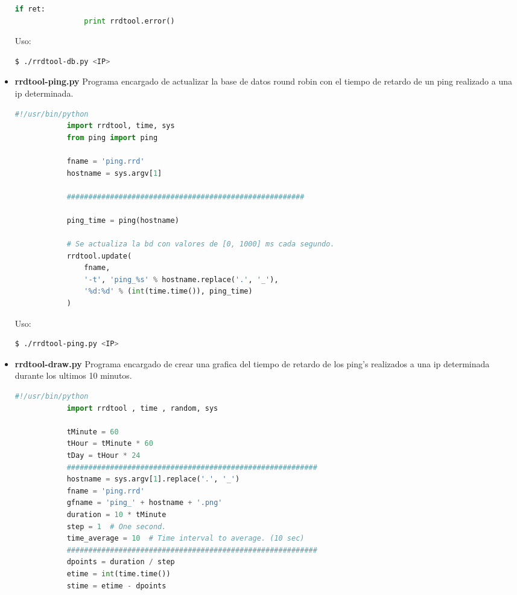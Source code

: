 \begin{itemize}
\begin{lstlisting}[language=python]
			if ret:
				print rrdtool.error()
		\end{lstlisting}
		Uso:\\
		\begin{lstlisting}[language=bash]
			$ ./rrdtool-db.py <IP>
		\end{lstlisting}
		
	\item {\bf rrdtool-ping.py} Programa encargado de actualizar la base de datos round robin con el tiempo de retardo de un ping realizado a una ip determinada.\\
		\begin{lstlisting}[language=python]
			#!/usr/bin/python
			import rrdtool, time, sys
			from ping import ping
			
			fname = 'ping.rrd'
			hostname = sys.argv[1]
			
			#######################################################
			
			ping_time = ping(hostname)

			# Se actualiza la bd con valores de [0, 1000] ms cada segundo.
			rrdtool.update(
				fname,
				'-t', 'ping_%s' % hostname.replace('.', '_'),
				'%d:%d' % (int(time.time()), ping_time)
			)
		\end{lstlisting}
		Uso:\\
		\begin{lstlisting}[language=bash]
			$ ./rrdtool-ping.py <IP>
		\end{lstlisting}

	\item {\bf rrdtool-draw.py} Programa encargado de crear una grafica del tiempo de retardo de los ping's realizados a una ip determinada durante los ultimos 10 minutos.\\
		\begin{lstlisting}[language=python]
			#!/usr/bin/python
			import rrdtool , time , random, sys
			
			tMinute = 60
			tHour = tMinute * 60
			tDay = tHour * 24
			##########################################################
			hostname = sys.argv[1].replace('.', '_')
			fname = 'ping.rrd'
			gfname = 'ping_' + hostname + '.png'
			duration = 10 * tMinute
			step = 1  # One second.
			time_average = 10  # Time interval to average. (10 sec)
			##########################################################
			dpoints = duration / step
			etime = int(time.time())
			stime = etime - dpoints
			

\end{lstlisting}
\end{itemize}
